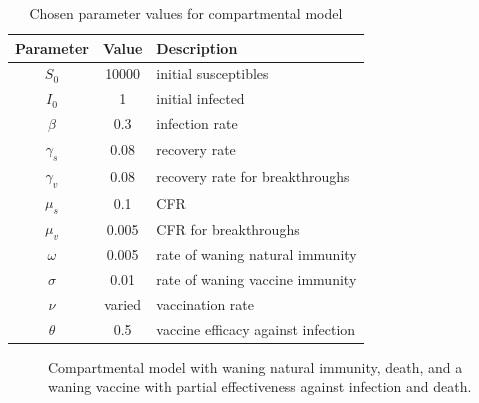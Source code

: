 \documentclass[11pt]{article}
\begin{document}
\begin{table}[h]
    \centering
    \caption{Chosen parameter values for compartmental model}
    \begin{tabular}{|c|c|l|}
        \hline
        Parameter & Value & Description \\
        \hline
        $S_0$ & 10000 & initial susceptibles \\
        $I_0$ & 1 & initial infected \\
        $\beta$ & 0.3&   infection rate \\
        $\gamma_s$ & 0.08&   recovery rate \\
        $\gamma_v$ & 0.08&   recovery rate for breakthroughs \\
        $\mu_s$ & 0.1&   CFR \\
        $\mu_v$ & 0.005&   CFR for breakthroughs \\
        $\omega$ & 0.005& rate of waning natural immunity \\
        $\sigma$ & 0.01& rate of waning vaccine immunity  \\
        $\nu$ & varied & vaccination rate  \\
        $\theta$ & 0.5&  vaccine efficacy against infection \\
        \hline
    \end{tabular}
\end{table}


\begin{figure}[t]
    \centering
   
    \caption{Compartmental model with waning natural immunity, death, and a waning vaccine with partial effectiveness against infection and death.}
    \label{fig:design1}
    \end{figure}
\end{document}
